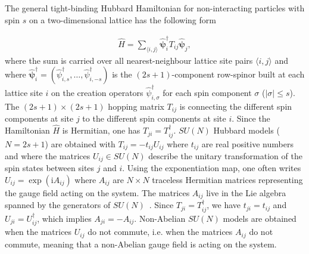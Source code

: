 \documentclass[aps,pra,showpacs,twocolumn,superscriptaddress]{revtex4-1}
\newcommand{\imag}{\mathrm{i}}
\begin{document}
The general tight-binding Hubbard Hamiltonian for non-interacting particles with spin $s$ on a 
two-dimensional lattice has the following form

\begin{align}
	\hat{H}= \sum_{\langle i,j\rangle} \hat{\bm{\psi}}_{i}^{\dagger}T_{ij}\hat{\bm{\psi}}_{j},
	\label{eq:hamil}
\end{align}
where the sum is carried over all nearest-neighbour lattice site pairs $\langle i,j\rangle$ and where 
${\hat{\bm{\psi}}_i^{\dagger}=\left(\hat{\psi}_{i,s}^{\dagger},\hdots,\hat{\psi}_{i,-s}^{\dagger}\right)}$ 
is the $(2s+1)$-component row-spinor built at each lattice site $i$ on 
the creation operators $\hat{\psi}^{\dagger}_{i,\sigma}$ for each spin 
component $\sigma$ ($|\sigma| \leq s$). The $(2s+1)\times(2s+1)$ hopping matrix $T_{ij}$ is 
connecting the different spin components at site $j$ to the different spin components at site $i$. 
Since the Hamiltonian $\hat{H}$ is Hermitian, one has $T_{ji}=T^{\dagger}_{ij}$. $SU(N)$ 
Hubbard models ($N=2s+1$) are obtained with $T_{ij}=-t_{ij} U_{ij}$ where $t_{ij}$ are real 
positive numbers and where the matrices $U_{ij} \in SU(N)$ describe the unitary transformation of 
the spin states between sites $j$ and $i$. Using the exponentiation map, 
one often writes $U_{ij} = \exp{(\imag A_{ij})}$ where $A_{ij}$ are $N\times N$ 
traceless Hermitian matrices representing the gauge field acting on the system. 
The matrices $A_{ij}$ live in the Lie algebra spanned by the generators of 
$SU(N)$~\cite{GilmoreBook}. Since $T_{ji}=T^{\dagger}_{ij}$, 
we have $t_{ji} = t_{ij}$ and $U_{ji}=U^{\dagger}_{ij}$, which implies $A_{ji} = -A_{ij}$. 
Non-Abelian $SU(N)$ models are obtained when the matrices $U_{ij}$ do not commute, i.e. 
when the matrices $A_{ij}$ do not commute, meaning that a non-Abelian gauge field is acting on the system.
\end{document}
